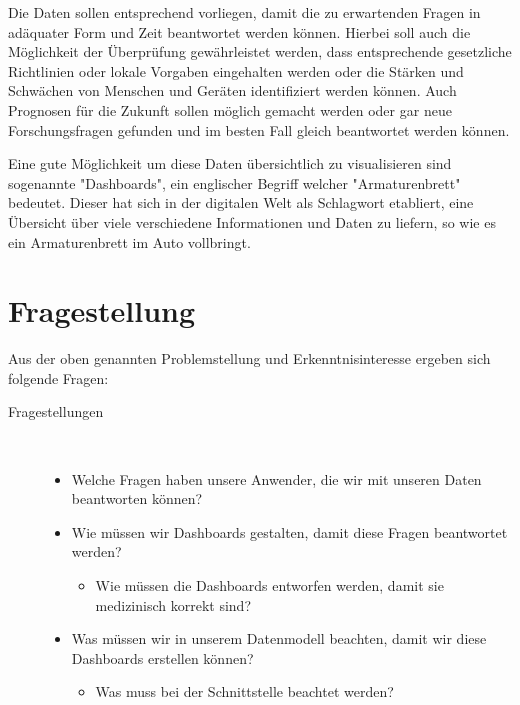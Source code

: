 \documentclass[12pt]{article}
\begin{document}
Die Daten sollen entsprechend vorliegen, damit die zu erwartenden
Fragen in adäquater Form und Zeit beantwortet werden können.
Hierbei soll auch die Möglichkeit der Überprüfung gewährleistet werden, dass entsprechende
gesetzliche Richtlinien \cite{Maconochie.2015} oder lokale Vorgaben eingehalten
werden oder die Stärken und Schwächen von Menschen und Geräten identifiziert werden können. Auch
Prognosen für die Zukunft sollen möglich gemacht werden oder gar neue Forschungsfragen gefunden  
und im besten Fall gleich beantwortet werden können.

Eine gute Möglichkeit um diese Daten übersichtlich zu visualisieren sind
sogenannte "Dashboards", ein englischer Begriff welcher "Armaturenbrett"
bedeutet. Dieser hat sich in der digitalen Welt als Schlagwort etabliert, eine
Übersicht über viele verschiedene Informationen und Daten zu liefern, so wie es
ein Armaturenbrett im Auto vollbringt.


\section{Fragestellung}\label{fragen}
Aus der oben genannten Problemstellung und Erkenntnisinteresse ergeben sich
folgende Fragen:
\begin{description}
\item[Fragestellungen]~\par
\begin{itemize}
      \item Welche Fragen haben unsere Anwender, die wir mit unseren Daten beantworten können?    
      \item Wie müssen wir Dashboards gestalten, damit diese Fragen beantwortet werden?
      \begin{itemize}
        \item Wie müssen die Dashboards entworfen werden, damit sie medizinisch korrekt sind?  
      \end{itemize}
      \item Was müssen wir in unserem Datenmodell beachten, damit wir diese Dashboards erstellen können?
      \begin{itemize}
        \item Was muss bei der Schnittstelle beachtet werden?
      \end{itemize}
\end{itemize}
\end{description}
\end{document}
